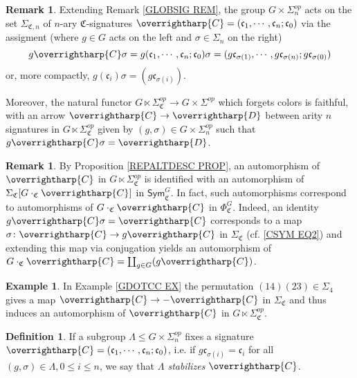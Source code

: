 \documentclass[a4paper,10pt
,draft
]{article}%
\numberwithin{equation}{section}
\numberwithin{figure}{section}
\theoremstyle{definition} %
\newtheorem{definition}[equation]{Definition}%
\newtheorem{example}[equation]{Example}%
\newtheorem{remark}[equation]{Remark}%
\newcommand{\vect}[1]{\text{\overrightharp{\ensuremath{#1}}}}
\newcommand{\1}{\ensuremath{\mathbbm 1}}%
\begin{document}
\begin{remark}\label{SIGACT REM}
Extending Remark \ref{GLOBSIG REM}, 
the group $G \times \Sigma_n^{op}$
acts on the set $\Sigma_{\mathfrak{C},n}$
of $n$-ary $\mathfrak{C}$-signatures
$\vect{C} = (\mathfrak{c}_1,\cdots,\mathfrak{c}_n;\mathfrak{c}_0)$
via the assigment (where $g \in G$ acts on the left and $\sigma \in \Sigma_n$ on the right)
\begin{equation}\label{SIGACT_EQ}
	g \vect{C} \sigma =
	g (\mathfrak{c}_1,\cdots,\mathfrak{c}_n;\mathfrak{c}_0) \sigma
=
	(g\mathfrak{c}_{\sigma(1)},\cdots,g\mathfrak{c}_{\sigma(n)};g\mathfrak{c}_{\sigma(0)})
\end{equation}
or, more compactly, $g (\mathfrak{c}_i) \sigma = (g \mathfrak{c}_{\sigma(i)})$.

Moreover, the natural functor 
$G \ltimes \Sigma^{op}_{\mathfrak{C}}
\to G \times \Sigma^{op}$
which forgets colors is faithful,
with an arrow
$\vect{C} \to \vect{D}$
between arity $n$ signatures
in $G \ltimes \Sigma_{\mathfrak{C}}^{op}$
given by 
$(g,\sigma) \in G \times \Sigma_n^{op}$
such that
$g \vect{C} \sigma = \vect{D}$.
\end{remark}



\begin{remark}
By Proposition \ref{REPALTDESC PROP},
an automorphism of $\vect{C}$ in 
$G \ltimes \Sigma_{\mathfrak{C}}^{op}$
is identified with an automorphism of 
$\Sigma_{\mathfrak{C}}[G \cdot_{\mathfrak{C}} \vect{C}]$
in $\mathsf{Sym}^G_{\mathfrak{C}}$.
In fact, such automorphisms 
correspond to automorphisms of 
$G \cdot_{\mathfrak{C}} \vect{C}$ in $\Phi^G_{\mathfrak{C}}$.
Indeed, an identity 
$g \vect{C} \sigma = \vect{C}$
corresponds to a map 
$\sigma \colon \vect{C} \to g \vect{C}$
in $\Sigma_{\mathfrak{C}}$
(cf. \eqref{CSYM EQ2})
and extending this map via conjugation yields 
an automorphism of
$G \cdot_{\mathfrak{C}} \vect{C} = \coprod_{g \in G} (g\vect{C})$.
\end{remark}


\begin{example}
In Example \ref{GDOTCC EX}
the permutation $(14)(23) \in \Sigma_4$
gives a map $\vect{C} \to -\vect{C}$ in $\Sigma_{\mathfrak{C}}$
and thus induces an automorphism of
$\vect{C}$ in $G \ltimes \Sigma_{\mathfrak{C}}^{op}$.
\end{example}



\begin{definition}
If a subgroup $\Lambda \leq G \times \Sigma_n^{op}$
fixes a signature 
$\vect{C} = (\mathfrak{c}_1,\cdots,\mathfrak{c}_n;\mathfrak{c}_0)$,
i.e. if
$g\mathfrak{c}_{\sigma(i)} = \mathfrak{c}_i$
for all $(g, \sigma) \in \Lambda, 0 \leq i \leq n$,
we say that \textit{$\Lambda$ stabilizes $\vect C$}. 
\end{definition}
\end{document}
